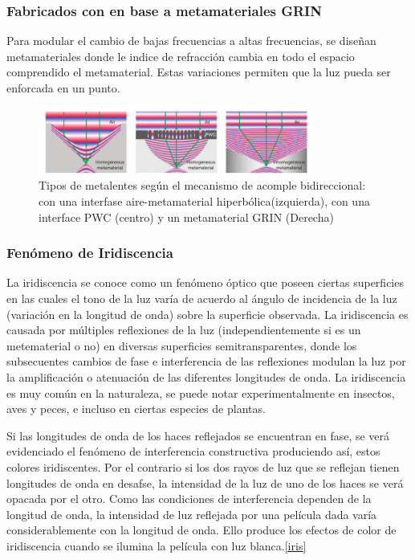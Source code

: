 \documentclass[a4paper, twocolumn, 10pt]{article}
\begin{document}
\subsubsection*{Fabricados con en base a metamateriales GRIN}

Para modular el cambio de bajas frecuencias a altas frecuencias, se diseñan metamateriales donde le indice de refracción cambia en todo el espacio comprendido el metamaterial. Estas variaciones permiten que la luz pueda ser enforcada en un punto.


\begin{figure}[h!]
    \centering
    \includegraphics[width = 0.8\textwidth]{metalentes3.png}
    \caption{Tipos de metalentes según el mecanismo de acomple bidireccional: con una interfase aire-metamaterial hiperbólica(izquierda), con una interface PWC (centro) y un metamaterial GRIN (Derecha)}
    \label{tipos}
\end{figure}

\subsubsection*{Fenómeno de Iridiscencia}


\noindent La iridiscencia se conoce como un fenómeno óptico  que poseen ciertas superficies en las cuales el tono de la luz varía de acuerdo al ángulo de incidencia de la luz (variación en la longitud de onda) sobre la superficie observada. La iridiscencia es causada por múltiples reflexiones de la luz (independientemente si es un metematerial o no) en diversas superficies semitransparentes, donde los subsecuentes cambios de fase e interferencia de las reflexiones modulan la luz por la amplificación o atenuación de las diferentes longitudes de onda. La iridiscencia es muy común en la naturaleza, se puede notar experimentalmente en insectos, aves y peces, e incluso en ciertas especies de plantas.

\noindent Si las longitudes de onda de los haces reflejados se encuentran en fase, se verá evidenciado el fenómeno de interferencia constructiva produciendo así, estos colores iridiscentes. Por el contrario si los dos rayos de luz que se reflejan tienen longitudes de onda en desafse, la intensidad de la luz de uno de los haces se verá opacada por el otro. Como las condiciones de interferencia dependen de la longitud de onda, la intensidad de luz reflejada por una película dada varía considerablemente con la longitud de onda. Ello produce los efectos de color de iridiscencia cuando se ilumina la película con luz blanca.\ref{iris}
\end{document}
